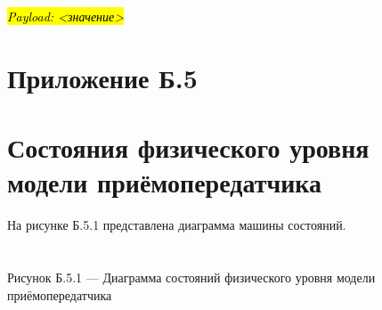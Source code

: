 \emph{\hl{Payload: \textless значение\textgreater{}}}\\
\hl{}

\section{Приложение
Б.5}\label{ux43fux440ux438ux43bux43eux436ux435ux43dux438ux435-ux431.5}

\section{}\label{section-5}

\section{Состояния физического уровня модели
приёмопередатчика}\label{ux441ux43eux441ux442ux43eux44fux43dux438ux44f-ux444ux438ux437ux438ux447ux435ux441ux43aux43eux433ux43e-ux443ux440ux43eux432ux43dux44f-ux43cux43eux434ux435ux43bux438-ux43fux440ux438ux451ux43cux43eux43fux435ux440ux435ux434ux430ux442ux447ux438ux43aux430}

На рисунке Б.5.1 представлена диаграмма машины состояний.

\section{}\label{section-6}

Рисунок Б.5.1 --- Диаграмма состояний физического уровня модели
приёмопередатчика
